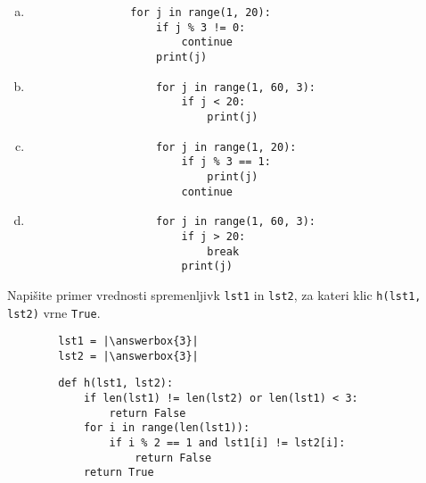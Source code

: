 \documentclass[arhiv, 10pt]{../izpit}
\newcommand{\inlinepy}[1]{\texttt{#1}}
\newcommand{\answerbox}[1]{\framebox{\vphantom{\large M}\hspace{#1cm}}}
\begin{document}
        \begin{multicols}{2}
        \begin{enumerate}[(a)]
\item 
            \begin{verbatim}
                for j in range(1, 20):
                    if j % 3 != 0:
                        continue
                    print(j)
            \end{verbatim}
        
\item 
                \begin{verbatim}
                    for j in range(1, 60, 3):
                        if j < 20:
                            print(j)
                \end{verbatim}
            
\item 
                \begin{verbatim}
                    for j in range(1, 20):
                        if j % 3 == 1:
                            print(j)
                        continue
                \end{verbatim}
            
\item 
                \begin{verbatim}
                    for j in range(1, 60, 3):
                        if j > 20:
                            break
                        print(j)
                \end{verbatim}
            
\end{enumerate}

        \end{multicols}
    
        \naloga*
        \begin{multicols}{2}
        \noindent
        Napišite primer vrednosti spremenljivk \inlinepy{lst1} in \inlinepy{lst2}, za kateri klic \inlinepy{h(lst1, lst2)} vrne \inlinepy{True}.
        \begin{verbatim}
        lst1 = |\answerbox{3}|
        lst2 = |\answerbox{3}|
        \end{verbatim}
        \vfil
        \columnbreak
        \begin{verbatim}
        def h(lst1, lst2):
            if len(lst1) != len(lst2) or len(lst1) < 3:
                return False
            for i in range(len(lst1)):
                if i % 2 == 1 and lst1[i] != lst2[i]:
                    return False
            return True
        \end{verbatim}
        \end{multicols}
    
\end{document}
